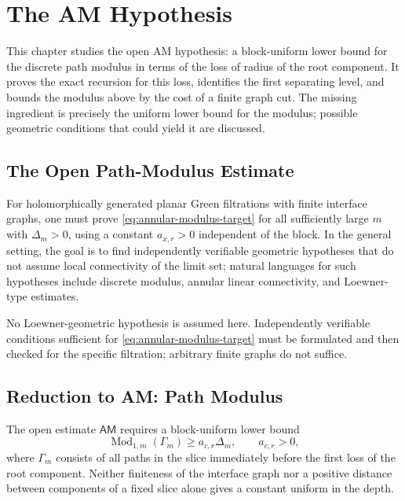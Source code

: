 \chapter{The AM Hypothesis}
\noindent This chapter studies the open AM hypothesis: a block-uniform lower bound for the discrete path modulus in terms of the loss of radius of the root component. It proves the exact recursion for this loss, identifies the first separating level, and bounds the modulus above by the cost of a finite graph cut. The missing ingredient is precisely the uniform lower bound for the modulus; possible geometric conditions that could yield it are discussed.

\section{The Open Path-Modulus Estimate}

\begin{openestimate}
\label{thm:annular-path-modulus}
For holomorphically generated planar Green filtrations with finite
interface graphs, one must prove \eqref{eq:annular-modulus-target} for
all sufficiently large \(m\) with \(\Delta_m>0\), using a constant
\(a_{x,r}>0\) independent of the block. In the general setting, the
goal is to find independently verifiable geometric hypotheses that do
not assume local connectivity of the limit set; natural languages for
such hypotheses include discrete modulus, annular linear connectivity,
and Loewner-type estimates.
\end{openestimate}
No Loewner-geometric hypothesis is assumed here. Independently
verifiable conditions sufficient for \eqref{eq:annular-modulus-target}
must be formulated and then checked for the specific filtration;
arbitrary finite graphs do not suffice.

\section{Reduction to AM: Path Modulus}
\label{sec:am-open-reductions}

The open estimate \(\mathsf{AM}\) requires a block-uniform lower bound
\[
 \operatorname{Mod}_{1,m}(\Gamma_m)\ge a_{c,r}\Delta_m,
 \qquad a_{c,r}>0,
\]
where \(\Gamma_m\) consists of all paths in the slice immediately before
the first loss of the root component. Neither finiteness of the
interface graph nor a positive distance between components of a fixed
slice alone gives a constant uniform in the depth.

